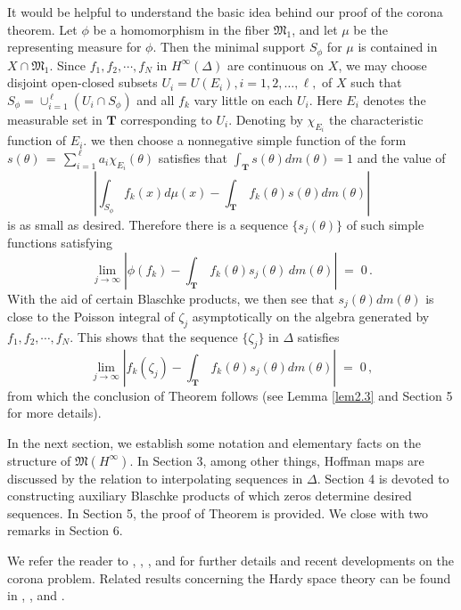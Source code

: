 \documentclass[12pt]{amsart}
\theoremstyle{plain}
\numberwithin{equation}{section}
\begin{document}
It would be helpful to understand the basic idea behind
our proof of the corona theorem. Let $\phi$ be a homomorphism in
the fiber $\mathfrak{M}_1$, and let $\mu$ be the representing
measure for $\phi$. Then the minimal support $S_\phi$ for $\mu$
is contained in $X \cap \mathfrak{M}_1$.
Since $f_1,f_2, \cdots, f_N $ in $H^\infty(\Delta)$ are continuous
on $X$, we may choose disjoint open-closed subsets
$U_i=U(E_i), i = 1, 2, \dots ,\ell,$ of $X$ such that $S_{\phi} = \cup_{i=1}^{\,\ell} (U_i \cap S_{\phi})$
and all $f_k$ vary little on each $U_i$. Here $E_i$ denotes the
measurable set in $\mathbf{T}$ corresponding to $U_i$.
Denoting by $\chi_{E_i}$  the characteristic function of $E_i$.
we then choose a nonnegative simple function of the form
$s(\theta) \,=\, \sum_{i=1}^{\,\ell} a_i \chi_{E_i}(\theta)$
satisfies that $\int_{\mathbf{T}} s(\theta) dm(\theta) = 1$
and the value of
\begin{equation*}
\left\vert \int_{S_{\phi}} f_k(x) d\mu(x) - \int_{\mathbf{T}} \,
f_k(\theta) s(\theta) dm(\theta) \right\vert
\end{equation*}
is as small as desired. Therefore there is
a sequence $\{s_j(\theta)\}$ of such simple functions satisfying
\begin{equation*}
\lim_{j\to \infty} \left\vert \phi(f_k) -
\int_{\mathbf{T}} \, f_k(\theta) s_j(\theta)\,
dm(\theta)  \right\vert \;=\; 0\,.
\end{equation*}
With the aid of certain Blaschke products, we then see that
$s_j(\theta) dm(\theta)$ is close to the Poisson
integral of $\zeta_j$ asymptotically on the algebra
generated by $f_1,f_2, \cdots, f_N $.
This shows that the sequence $\{\zeta_j\}$ in $\Delta$
satisfies
\begin{equation*}
\lim_{j\to \infty} \left\vert f_k(\zeta_j) -
\int_{\mathbf{T}} \, f_k(\theta) s_j(\theta)
dm(\theta) \right\vert \;=\; 0\,,
\end{equation*}
from which the conclusion of Theorem follows (see
Lemma \ref{lem2.3} and Section 5 for more details).

\medskip
In the next section, we establish some notation and elementary
facts on the structure of $\mathfrak{M}(H^\infty)$. In Section 3,
among other things, Hoffman maps are discussed by the relation to
interpolating sequences in $\Delta$.
Section 4 is devoted to constructing auxiliary Blaschke products
of which zeros determine desired sequences.
In Section 5, the proof of Theorem is provided.
We close with two remarks in Section 6.

\medskip
We refer the reader to \cite{A}, \cite{C}, \cite{D}, \cite[Chapter VIII]{Ga}
and \cite[Appendix 3]{N} for further details and recent developments
on the corona problem.
Related results concerning the Hardy space theory can be found in
\cite{G1}, \cite{Ga}, \cite{H} and \cite{N}.
\end{document}
